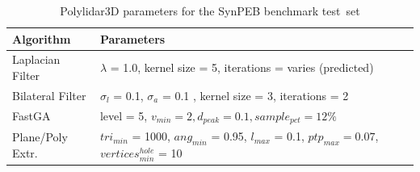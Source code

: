 \begin{table}[H]
\centering
\caption{Polylidar3D parameters for the SynPEB benchmark test~set}\label{table:ch3_synpeb_parameters}
\begin{tabular}{@{}ll@{}}
\toprule
\textbf{Algorithm}        & \textbf{Parameters}                                                          \\ \midrule
Laplacian Filter & $\lambda$ = 1.0, kernel size = 5, iterations = varies (predicted)   \\
Bilateral Filter & $\sigma_l$ = 0.1, $\sigma_a$ = 0.1 , kernel size = 3, iterations = 2 \\
FastGA           & level = 5,  $v_{min} = 2, d_{peak} = 0.1, sample_{pct} = 12\%$            \\
Plane/Poly Extr.      & $tri_{min}$ = 1000, $ang_{min}$ = 0.95, $l_{max}$ = 0.1, $ptp_{max} = 0.07$, $vertices^{hole}_{min}$ = 10     \\ \bottomrule
\end{tabular}
\end{table}


